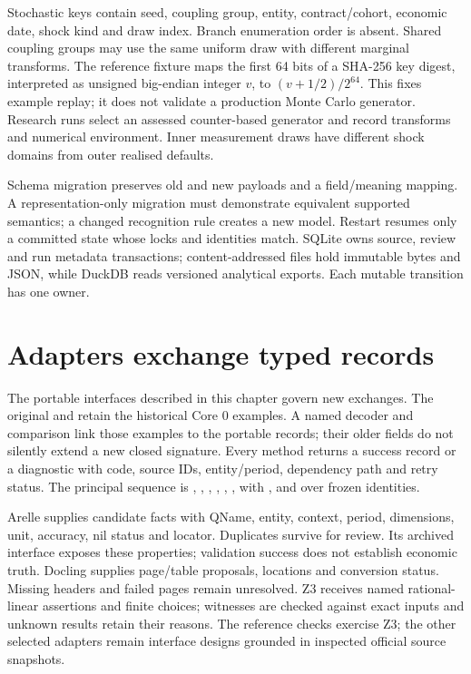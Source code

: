 Stochastic keys contain seed, coupling group, entity, contract/cohort,
economic date, shock kind and draw index. Branch enumeration order is absent.
Shared coupling groups may use the same uniform draw with different marginal
transforms. The reference fixture maps the first 64 bits of a SHA-256 key
digest, interpreted as unsigned big-endian integer $v$, to
$(v+1/2)/2^{64}$. This fixes example replay; it does not validate a production
Monte Carlo generator. Research runs select an assessed counter-based
generator and record transforms and numerical environment. Inner measurement
draws have different shock domains from outer realised defaults.

Schema migration preserves old and new payloads and a field/meaning mapping.
A representation-only migration must demonstrate equivalent supported
semantics; a changed recognition rule creates a new model. Restart resumes
only a committed state whose locks and identities match. SQLite owns source,
review and run metadata transactions; content-addressed files hold immutable
bytes and JSON, while DuckDB reads versioned analytical exports. Each mutable
transition has one owner.

\section{Adapters exchange typed records}

The portable interfaces described in this chapter govern new exchanges.
The original  and
 retain the historical Core 0 examples.
A named decoder and comparison link those examples to the portable records;
their older fields do not silently extend a new closed signature. Every method returns a success record or a
diagnostic with code, source IDs, entity/period, dependency path and retry
status. The principal sequence is , ,
, , , , with
,  and  over frozen identities.

Arelle supplies candidate facts with QName, entity, context, period,
dimensions, unit, accuracy, nil status and locator. Duplicates survive for
review. Its archived  interface exposes these
properties; validation success does not establish economic truth. Docling
supplies page/table proposals, locations and conversion status. Missing
headers and failed pages remain unresolved. Z3 receives named rational-linear
assertions and finite choices; witnesses are checked against exact inputs and
unknown results retain their reasons. The reference checks exercise Z3;
the other selected adapters remain interface designs grounded in inspected
official source snapshots.

